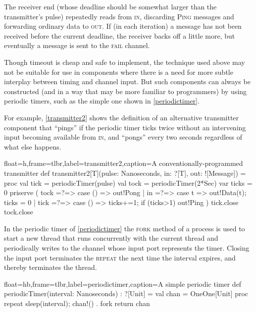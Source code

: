 \documentclass[12pt]{IOS-Book-Article-CPA-2017}
\begin{document}
The receiver end (whose deadline should be somewhat larger 
than the transmitter's pulse) repeatedly reads from \textsc{in},
discarding \textsc{Ping} messages and forwarding ordinary
data to \textsc{out}. If (in each iteration) a message has not been
received before the current deadline, the receiver backs off a little more, 
but eventually a message is sent to the \textsc{fail} channel.


Though timeout is cheap and safe to implement, the
technique used above may not be suitable for use in components where
there is a need for more subtle interplay between timing and channel
input.
%
But such components can always be constructed (and in a way that
may be more familiar to \occam programmers) by using periodic timers,
such as the simple one shown in \Listing
\ref{periodictimer}.

For example, \Listing \ref{transmitter2} shows the definition of
an alternative transmitter component that ``pings'' if the periodic
timer ticks twice without an intervening input becoming available
from \textsc{in}, and ``pongs'' every two seconds regardless of
what else happens.

\begin{code+}[...]{float=h,frame=tlbr,label=transmitter2,caption={A conventionally-programmed transmitter}}
 def transmitter2[T](pulse: Nanoseconds, in: ?[T], out: ![Message]) = 
 proc 
 { val tick  = periodicTimer(pulse)
   val tock  = periodicTimer(2*Sec)
   var ticks = 0
   priserve ( tock =?=> { case () => out!Pong }
            | in   =?=> { case t  => out!Data(t); ticks = 0 }
            | tick =?=> { case () => ticks+=1; if (ticks>1) out!Ping }
            ) 
   tick.close
   tock.close
 } 
\end{code+}
In the periodic timer of \Listing \ref{periodictimer} the \textsc{fork} method of a process
is used to start a new thread that runs concurrently with the current thread and periodically writes
to the channel whose input port represents the timer. Closing the
input port terminates the \textsc{repeat} the next time the interval
expires, and thereby terminates the thread.
\begin{code+}[...]{float=hb,frame=tlbr,label=periodictimer,caption={A simple periodic timer}}
 def periodicTimer(interval: Nanoseconds) : ?[Unit] = 
 { val chan = OneOne[Unit]
   proc { repeat { sleep(interval); chan!() } } . fork
   return chan
 }
\end{code+}
\end{document}
